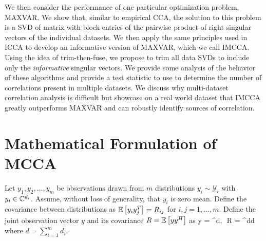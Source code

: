 We then consider the performance of one particular optimization problem, MAXVAR. We show
that, similar to empirical CCA, the solution to this problem is a SVD of matrix with block
entries of the pairwise product of right singular vectors of the individual datasets. We
then apply the same principles used in ICCA to develop an informative version of MAXVAR,
which we call IMCCA. Using the idea of trim-then-fuse, we propose to trim all data SVDs to
include only the \textit{informative} singular vectors. We provide some analysis of the
behavior of these algorithms and provide a test statistic to use to determine the number
of correlations present in multiple datasets. We discuss why multi-dataset correlation
analysis is difficult but showcase on a real world dataset that IMCCA greatly outperforms
MAXVAR and can robustly identify sources of correlation.


\section{Mathematical Formulation of MCCA}



Let $y_1,y_2,\dots,y_m$ be observations drawn from $m$ distributions $y_i\sim
\mathcal{Y}_i$ with $y_i\in\mathbb{C}^{d_i}$. Assume, without loss of generality, that $y_i$
is zero mean. Define the covariance between distributions as $\mathbb{E}\left[{y_iy_j^T}\right]=R_{ij}$ for
$i,j=1,\dots,m$. Define the joint observation vector $y$ and its covariance $R=\mathbb{E}\left[{yy^H}\right]$ as
\be
y =  \in\complex^{d},\,\,\,\,R
= \in\complex^{d\times d}
\ee
where $d=\sum_{i=1}^md_i$.

